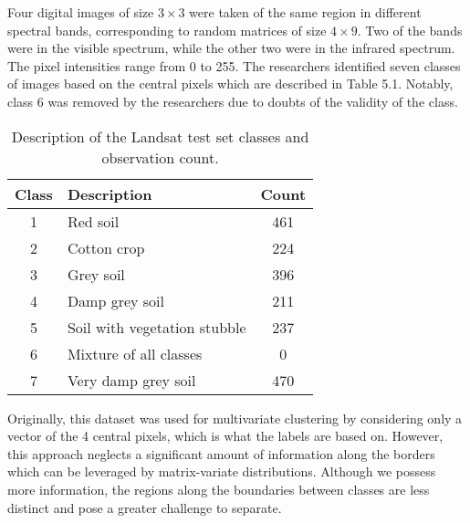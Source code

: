 \documentclass[12pt]{report}
\begin{document}
Four digital images of size $3 \times 3$ were taken of the same region in different spectral bands, corresponding to random matrices of size $4\times 9$. Two of the bands were in the visible spectrum, while the other two were in the infrared spectrum. The pixel intensities range from 0 to 255. The researchers identified seven classes of images based on the central pixels which are described in Table 5.1. Notably, class 6 was removed by the researchers due to doubts of the validity of the class.
\setcounter{table}{0}
\begin{table}[!htbp]
  \caption{Description of the Landsat test set classes and observation count.}
  \vspace{0.5cm}
  \begin{tabularx}{\textwidth}{cXc}
    \toprule
    \textbf{Class} & \textbf{Description} & \textbf{Count} \\
    \midrule
    1 & Red soil                        & 461 \\
    2 & Cotton crop                     & 224 \\
    3 & Grey soil                       & 396 \\
    4 & Damp grey soil                  & 211 \\
    5 & Soil with vegetation stubble    & 237 \\
    6 & Mixture of all classes          & 0 \\
    7 & Very damp grey soil             & 470 \\
    \bottomrule
  \end{tabularx}
\end{table}

Originally, this dataset was used for multivariate clustering by considering only a vector of the 4 central pixels, which is what the labels are based on. However, this approach neglects a significant amount of information along the borders which can be leveraged by matrix-variate distributions. Although we possess more information, the regions along the boundaries between classes are less distinct and pose a greater challenge to separate.
 
\end{document}
